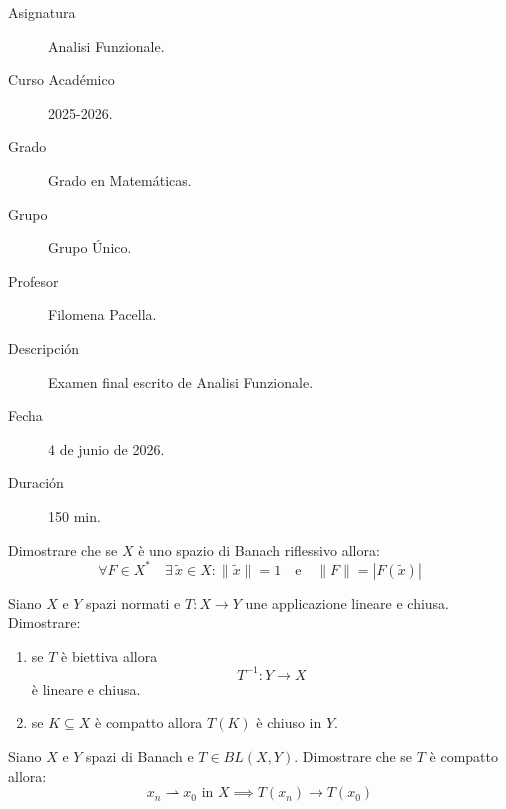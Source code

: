 \documentclass[12pt]{article}
\begin{document}

    
	

    \begin{description}
        \item[Asignatura] Analisi Funzionale.
        \item[Curso Académico] 2025-2026.
        \item[Grado] Grado en Matemáticas.
        \item[Grupo] Grupo Único.
        \item[Profesor] Filomena Pacella.
        \item[Descripción] Examen final escrito de Analisi Funzionale.
        \item[Fecha] 4 de junio de 2026.
        \item[Duración] 150 min.
    
    \end{description}
    \newpage

    
    \begin{ejercicio}[4 punti]
        Dimostrare che se $X$ è uno spazio di Banach riflessivo allora:
		\[
		\forall F \in X^* \quad \exists \, \widetilde{x} \in X : \|\widetilde{x}\| = 1 \quad \text{e} \quad \|F\| = |F(\widetilde{x})|
		\]


    \end{ejercicio}

	\begin{ejercicio}[5 punti]
		Siano $X$ e $Y$ spazi normati e $T : X \to Y$ une applicazione lineare e chiusa. Dimostrare:
		\begin{enumerate}
			\item[(i)] se $T$ è biettiva allora 
			$$T^{-1} : Y \to X$$ 
			è lineare e chiusa.
			\item[(ii)] se $K \subseteq X$ è compatto allora $T(K)$ è chiuso in $Y$.
		\end{enumerate}
	\end{ejercicio}

	\begin{ejercicio}[4 punti]
		Siano $X$ e $Y$ spazi di Banach e $T \in BL(X,Y)$. Dimostrare che se $T$ è compatto allora:
		\[
		x_n \rightharpoonup x_0 \text{ in } X \implies T(x_n) \to T(x_0)
		\]
	\end{ejercicio}
\end{document}
